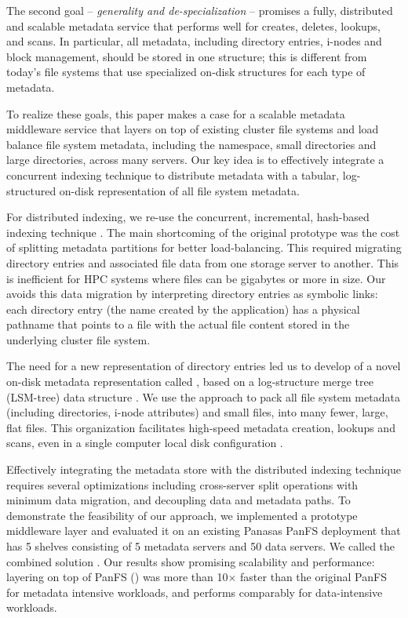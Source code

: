 The second goal -- \textit{generality and de-specialization} -- promises a
fully, distributed and scalable metadata service
that performs well for creates, deletes, lookups, and scans.
In particular, all metadata, including directory entries, i-nodes and block
management, should be stored in one structure; this is different from
today's file systems that use specialized on-disk structures for each type of
metadata.

To realize these goals, this paper makes a case for a scalable metadata
middleware service \sys that layers on top of existing cluster file systems and
load balance file system metadata, including the namespace, small
directories and large directories, across many servers.
Our key idea is to effectively integrate a concurrent indexing
technique to distribute metadata with a tabular, log-structured on-disk
representation of all file system metadata.

For distributed indexing, we re-use the concurrent, incremental, hash-based
\giga indexing technique \cite{GIGA11}.
The main shortcoming of the original \giga prototype was the cost of splitting
metadata partitions for better load-balancing. This required migrating
directory entries and associated file data \cite{GIGA11} from one storage
server to another.
This is inefficient for HPC systems where files can be gigabytes or more in
size. Our \sys avoids this data migration by interpreting directory
entries as symbolic links: each directory entry (the name created by the
application) has a physical pathname that points to a file
with the actual file content stored in the underlying cluster file system.

The need for a new representation of directory entries led us to develop
of a novel on-disk metadata representation called \tfs \cite{TableFS},
based on a log-structure merge tree (LSM-tree) data structure \cite{ONeil1996}.
We use the \tfs approach to pack all file system metadata
(including directories, i-node attributes) and small files,
into many fewer, large, flat files.
This organization facilitates high-speed metadata creation, lookups and scans,
even in a single computer local disk configuration \cite{TableFS}.

Effectively integrating the \tfs metadata store with the \giga distributed indexing
technique requires several optimizations including cross-server split operations
with minimum data migration, and decoupling data and metadata paths.
To demonstrate the feasibility of our approach,
we implemented a prototype middleware layer \sys and evaluated it
on an existing Panasas PanFS deployment \cite{PanFS} that has 5 shelves
consisting of 5 metadata servers and 50 data servers.
We called the combined solution \psys.
Our results show promising scalability and performance:
\sys layering on top of PanFS (\psys) was more than 10$\times$ faster than the original PanFS
for metadata intensive workloads, and performs comparably for data-intensive workloads.

